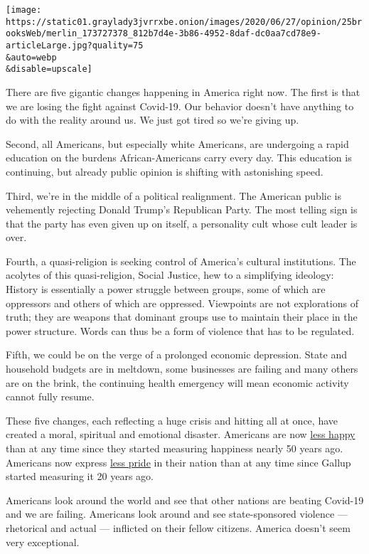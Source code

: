 \texttt{[image: https://static01.graylady3jvrrxbe.onion/images/2020/06/27/opinion/25brooksWeb/merlin\_173727378\_812b7d4e-3b86-4952-8daf-dc0aa7cd78e9-articleLarge.jpg?quality=75\\\&auto=webp\\\&disable=upscale]}

There are five gigantic changes happening in America right now. The
first is that we are losing the fight against Covid-19. Our behavior
doesn't have anything to do with the reality around us. We just got
tired so we're giving up.

Second, all Americans, but especially white Americans, are undergoing a
rapid education on the burdens African-Americans carry every day. This
education is continuing, but already public opinion is shifting with
astonishing speed.

Third, we're in the middle of a political realignment. The American
public is vehemently rejecting Donald Trump's Republican Party. The most
telling sign is that the party has even given up on itself, a
personality cult whose cult leader is over.

Fourth, a quasi-religion is seeking control of America's cultural
institutions. The acolytes of this quasi-religion, Social Justice, hew
to a simplifying ideology: History is essentially a power struggle
between groups, some of which are oppressors and others of which are
oppressed. Viewpoints are not explorations of truth; they are weapons
that dominant groups use to maintain their place in the power structure.
Words can thus be a form of violence that has to be regulated.

Fifth, we could be on the verge of a prolonged economic depression.
State and household budgets are in meltdown, some businesses are failing
and many others are on the brink, the continuing health emergency will
mean economic activity cannot fully resume.

These five changes, each reflecting a huge crisis and hitting all at
once, have created a moral, spiritual and emotional disaster. Americans
are now
\href{https://www.norc.org/Research/Projects/Pages/covid-response-tracking-study.aspx}{less
happy} than at any time since they started measuring happiness nearly 50
years ago. Americans now express
\href{https://news.gallup.com/poll/312644/national-pride-falls-record-low.aspx}{less
pride} in their nation than at any time since Gallup started measuring
it 20 years ago.

Americans look around the world and see that other nations are beating
Covid-19 and we are failing. Americans look around and see
state-sponsored violence --- rhetorical and actual --- inflicted on
their fellow citizens. America doesn't seem very exceptional.

